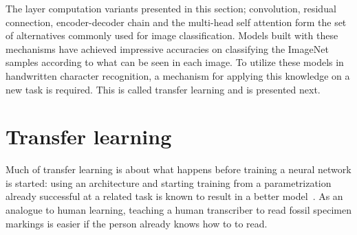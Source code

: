 \documentclass[english,twoside,openright]{UH_DS_MSc}
\begin{document}
The layer computation variants presented in this section; convolution, residual connection, encoder-decoder chain and 
the multi-head self attention form the set of alternatives commonly used for image classification. Models built with these mechanisms 
have achieved impressive accuracies on classifying the ImageNet samples according to what can be seen in each image.
To utilize these models in handwritten character recognition, a mechanism for applying this knowledge on a new task is required.
This is called transfer learning and is presented next.

\section{Transfer learning}
\label{sect:transfer_learning}

Much of transfer learning is about what happens before training a neural network is started: using an architecture and starting training from a parametrization already successful at a related task
is known to result in a better model~\cite{transferlearning_survey}. As an analogue to human learning, teaching a human transcriber to read fossil specimen markings is easier if the person already knows how to to read.
\end{document}
